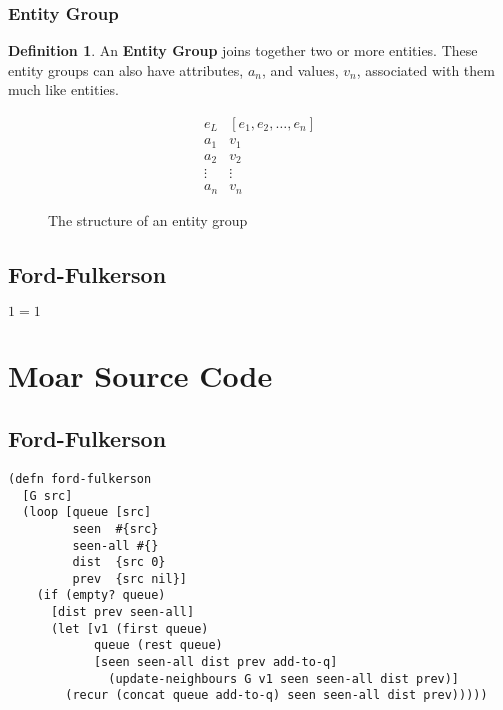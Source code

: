 \documentclass[12pt,letterpaper,oneside,draft]{report}
\theoremstyle{definition}
\newtheorem{defn}{Definition}
\begin{document}
			\subsection{Entity Group}
				\begin{defn}
					An \textbf{Entity Group} joins together two or more entities.  These entity groups can also have attributes, $a_n$, and values, $v_n$, associated with them much like entities.

					\begin{figure}[!ht]
						\centering
						\[
							\begin{array}{ll}
								e_L & \left[ e_1, e_2, \ldots, e_n \right] \\
								a_1 & v_1 \\
								a_2 & v_2 \\
								\vdots & \vdots \\
								a_n & v_n
							\end{array}
						\]
						\caption{The structure of an entity group}
						\label{fig:entity-group-rep}
					\end{figure}

				\end{defn}

		\section{Ford-Fulkerson}
			\begin{algorithm}
				\begin{algorithmic}
					\ENSURE $1=1$
				\end{algorithmic}
			\end{algorithm}

	\chapter{Moar Source Code}
		\section{Ford-Fulkerson}
			\begin{verbatim}
(defn ford-fulkerson
  [G src]
  (loop [queue [src]
         seen  #{src}
         seen-all #{}
         dist  {src 0}
         prev  {src nil}]
    (if (empty? queue)
      [dist prev seen-all]
      (let [v1 (first queue)
            queue (rest queue)
            [seen seen-all dist prev add-to-q]
              (update-neighbours G v1 seen seen-all dist prev)]
        (recur (concat queue add-to-q) seen seen-all dist prev)))))
			\end{verbatim}
\end{document}
